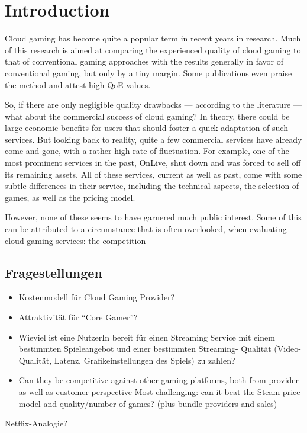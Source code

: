 

\section{Introduction}

Cloud gaming has become quite a popular term in recent years in research. Much of this research is aimed at comparing the experienced quality of cloud gaming to that of conventional gaming approaches with the results generally in favor of conventional gaming, but only by a tiny margin. Some publications even praise the method and attest high \gls{QoE} values.

So, if there are only negligible quality drawbacks --- according to the literature --- what about the commercial success of cloud gaming? In theory, there could be large economic benefits for users that should foster a quick adaptation of such services. But looking back to reality, quite a few commercial services have already come and gone, with a rather high rate of fluctuation. For example, one of the most prominent services in the past, OnLive, shut down and was forced to sell off its remaining assets. All of these services, current as well as past, come with some subtle differences in their service, including the technical aspects, the selection of games, as well as the pricing model.

However, none of these seems to have garnered much public interest. Some of this can be attributed to a circumstance that is often overlooked, when evaluating cloud gaming services: the competition 

\subsection{Fragestellungen}

\begin{itemize}
	\item Kostenmodell für Cloud Gaming Provider?
	\item Attraktivität für “Core Gamer”?
	\item Wieviel ist eine NutzerIn bereit für einen Streaming Service mit einem bestimmten Spieleangebot und einer bestimmten Streaming- Qualität (Video-Qualität, Latenz, Grafikeinstellungen des Spiels) zu zahlen?
	\item Can they be competitive against other gaming platforms, both from provider as well as customer perspective
			Most challenging: can it beat the Steam price model and quality/number of games? (plus bundle providers and sales)
\end{itemize}

Netflix-Analogie? 